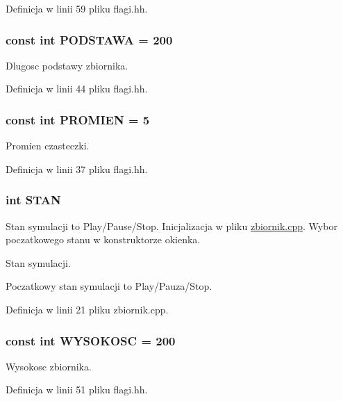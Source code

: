 Definicja w linii 59 pliku flagi.\-hh.

\hypertarget{flagi_8hh_acd3c5814c051e565bf7854f6403acf49}{
\subsubsection[{P\-O\-D\-S\-T\-A\-W\-A}]{\setlength{\rightskip}{0pt plus 5cm}const int P\-O\-D\-S\-T\-A\-W\-A = 200}}\label{flagi_8hh_acd3c5814c051e565bf7854f6403acf49}
Dlugosc podstawy zbiornika. 

Definicja w linii 44 pliku flagi.\-hh.

\hypertarget{flagi_8hh_aa77f856f3142a9e81752665a9bc2e6de}{
\subsubsection[{P\-R\-O\-M\-I\-E\-N}]{\setlength{\rightskip}{0pt plus 5cm}const int P\-R\-O\-M\-I\-E\-N = 5}}\label{flagi_8hh_aa77f856f3142a9e81752665a9bc2e6de}
Promien czasteczki. 

Definicja w linii 37 pliku flagi.\-hh.

\hypertarget{flagi_8hh_ae3a120c63186a17e4127a68187b3e9e8}{
\subsubsection[{S\-T\-A\-N}]{\setlength{\rightskip}{0pt plus 5cm}int S\-T\-A\-N}}\label{flagi_8hh_ae3a120c63186a17e4127a68187b3e9e8}
Stan symulacji to Play/\-Pause/\-Stop. Inicjalizacja w pliku \hyperlink{zbiornik_8cpp}{zbiornik.\-cpp}. Wybor poczatkowego stanu w konstruktorze okienka.

Stan symulacji.

Poczatkowy stan symulacji to Play/\-Pauza/\-Stop. 

Definicja w linii 21 pliku zbiornik.\-cpp.

\hypertarget{flagi_8hh_a073767f0ac7dbf009a42b00de1092b52}{
\subsubsection[{W\-Y\-S\-O\-K\-O\-S\-C}]{\setlength{\rightskip}{0pt plus 5cm}const int W\-Y\-S\-O\-K\-O\-S\-C = 200}}\label{flagi_8hh_a073767f0ac7dbf009a42b00de1092b52}
Wysokosc zbiornika. 

Definicja w linii 51 pliku flagi.\-hh.

